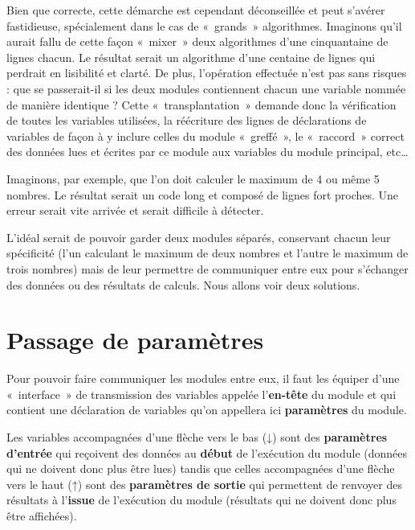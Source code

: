 
	Bien que correcte, cette démarche est cependant déconseillée et peut
	s’avérer fastidieuse, spécialement dans le cas de «~grands~»
	algorithmes. Imaginons qu’il aurait fallu de cette façon «~mixer~» deux
	algorithmes d’une cinquantaine de lignes chacun. Le résultat serait un
	algorithme d’une centaine de lignes qui perdrait en lisibilité et
	clarté. De plus, l’opération effectuée n’est pas sans risques : que se
	passerait-il si les deux modules contiennent chacun une variable nommée
	de manière identique ? Cette «~transplantation~» demande donc la
	vérification de toutes les variables utilisées, la réécriture des
	lignes de déclarations de variables de façon à y inclure celles du
	module «~greffé~», le «~raccord~» correct des données lues et écrites
	par ce module aux variables du module principal, etc… 
	
	Imaginons, par exemple, que l'on doit calculer le
	maximum de 4 ou même 5 nombres. Le résultat serait un code long et
	composé de lignes fort proches. Une erreur serait vite arrivée et
	serait difficile à détecter.
	
	L’idéal serait de pouvoir garder deux modules séparés, conservant chacun
	leur spécificité (l’un calculant le maximum de deux nombres et l’autre
	le maximum de trois nombres) mais de leur permettre de communiquer
	entre eux pour s’échanger des données ou des résultats de calculs. Nous
	allons voir deux solutions.

\section{Passage de paramètres}

	Pour pouvoir faire communiquer les modules entre eux, il faut les
	équiper d’une «~interface~» de transmission des variables appelée
	l’\textbf{en-tête }du module et qui contient une déclaration de
	variables qu’on appellera ici \textbf{paramètres} du module. 
	
	Les variables accompagnées d’une flèche vers le bas (\textsf{↓}) sont
	des \textbf{paramètres d’entrée} qui reçoivent des données au
	\textbf{début} de l’exécution du module (données qui ne doivent donc
	plus être lues) tandis que celles accompagnées d’une flèche vers le
	haut (\textsf{↑}) sont des \textbf{paramètres de sortie} qui permettent
	de renvoyer des résultats à l’\textbf{issue} de l’exécution du module
	(résultats qui ne doivent donc plus être affichées). 

